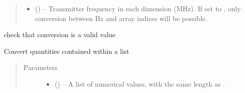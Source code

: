 \documentclass[letterpaper,10pt,english]{sphinxmanual}
\begin{document}
\begin{fulllineitems}
\begin{quote}
\begin{description}
\begin{itemize}
\item {} 
\sphinxAtStartPar
{} (\sphinxstyleliteralemphasis{\sphinxupquote{{[}}}\sphinxstyleliteralemphasis{\sphinxupquote{{]} or }}\sphinxstyleliteralemphasis{\sphinxupquote{{[}}}\sphinxstyleliteralemphasis{\sphinxupquote{, }}\sphinxstyleliteralemphasis{\sphinxupquote{{]} or }}\sphinxstyleliteralemphasis{\sphinxupquote{, }}) – Transmitter frequency in each dimension (MHz). If set to , only
conversion between Hz and array indices will be possible.

\end{itemize}

\end{description}\end{quote}

\begin{fulllineitems}
\label{\detokenize{references/misc:nmrespy._misc.FrequencyConverter._check_valid_conversion}}
\sphinxAtStartPar
check that conversion is a valid value

\end{fulllineitems}


\begin{fulllineitems}
\label{\detokenize{references/misc:nmrespy._misc.FrequencyConverter.convert}}
\sphinxAtStartPar
Convert quantities contained within a list
\begin{quote}\begin{description}
\item[{Parameters}] \leavevmode\begin{itemize}
\item {} 
\sphinxAtStartPar
{} () – A list of numerical values, with the same length as .


\end{itemize}
\end{description}
\end{quote}
\end{fulllineitems}
\end{fulllineitems}
\end{document}
